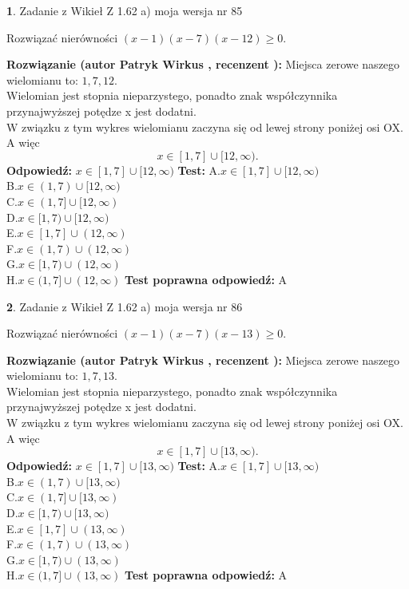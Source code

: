 \documentclass[12pt, a4paper]{article}
\theoremstyle{definition} %
\newtheorem{zad}{}
\newcommand{\zadStart}[1]{\begin{zad}#1\newline}
\newcommand{\zadStop}{\end{zad}}
\newcommand{\rozwStart}[2]{\noindent \textbf{Rozwiązanie (autor #1 , recenzent #2): }\newline}
\newcommand{\rozwStop}{\newline}
\newcommand{\odpStart}{\noindent \textbf{Odpowiedź:}\newline}
\newcommand{\odpStop}{\newline}
\newcommand{\testStart}{\noindent \textbf{Test:}\newline}
\newcommand{\testStop}{\newline}
\newcommand{\kluczStart}{\noindent \textbf{Test poprawna odpowiedź:}\newline}
\newcommand{\kluczStop}{\newline}
\begin{document}
\zadStart{Zadanie z Wikieł Z 1.62 a) moja wersja nr 85}

Rozwiązać nierówności $(x-1)(x-7)(x-12)\ge0$.
\zadStop
\rozwStart{Patryk Wirkus}{}
Miejsca zerowe naszego wielomianu to: $1, 7, 12$.\\
Wielomian jest stopnia nieparzystego, ponadto znak współczynnika przy\linebreak najwyższej potędze x jest dodatni.\\ W związku z tym wykres wielomianu zaczyna się od lewej strony poniżej osi OX. A więc $$x \in [1,7] \cup [12,\infty).$$
\rozwStop
\odpStart
$x \in [1,7] \cup [12,\infty)$
\odpStop
\testStart
A.$x \in [1,7] \cup [12,\infty)$\\
B.$x \in (1,7) \cup [12,\infty)$\\
C.$x \in (1,7] \cup [12,\infty)$\\
D.$x \in [1,7) \cup [12,\infty)$\\
E.$x \in [1,7] \cup (12,\infty)$\\
F.$x \in (1,7) \cup (12,\infty)$\\
G.$x \in [1,7) \cup (12,\infty)$\\
H.$x \in (1,7] \cup (12,\infty)$
\testStop
\kluczStart
A
\kluczStop



\zadStart{Zadanie z Wikieł Z 1.62 a) moja wersja nr 86}

Rozwiązać nierówności $(x-1)(x-7)(x-13)\ge0$.
\zadStop
\rozwStart{Patryk Wirkus}{}
Miejsca zerowe naszego wielomianu to: $1, 7, 13$.\\
Wielomian jest stopnia nieparzystego, ponadto znak współczynnika przy\linebreak najwyższej potędze x jest dodatni.\\ W związku z tym wykres wielomianu zaczyna się od lewej strony poniżej osi OX. A więc $$x \in [1,7] \cup [13,\infty).$$
\rozwStop
\odpStart
$x \in [1,7] \cup [13,\infty)$
\odpStop
\testStart
A.$x \in [1,7] \cup [13,\infty)$\\
B.$x \in (1,7) \cup [13,\infty)$\\
C.$x \in (1,7] \cup [13,\infty)$\\
D.$x \in [1,7) \cup [13,\infty)$\\
E.$x \in [1,7] \cup (13,\infty)$\\
F.$x \in (1,7) \cup (13,\infty)$\\
G.$x \in [1,7) \cup (13,\infty)$\\
H.$x \in (1,7] \cup (13,\infty)$
\testStop
\kluczStart
A
\kluczStop
\end{document}
